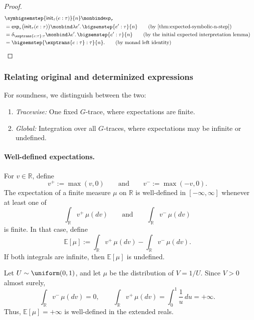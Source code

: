 \begin{proof}
  \begin{align}
    &\symbigsemstep{\mathsf{init}_\tau(e:\tau)}{n}
    \monbind
    \mathsf{exp}_\tau
    \notag
    \\
    &=
    \mathsf{exp}_\tau\bigl(\mathsf{init}_\tau(e:\tau)\bigr)
    \monbind
    \lambda e'.\,\bigsemstep{e':\tau}{n}
    \tag{\text{by \Cref{thm:expected-symbolic-n-step}}}
    \\
    &=
    \delta_{\exptrans{e:\tau}:\tau}
    \monbind
    \lambda e'.\,\bigsemstep{e':\tau}{n}
    \tag{\text{by the initial expected interpretation lemma}}
    \\
    &=
    \bigsemstep{\exptrans{e:\tau}:\tau}{n}.
    \tag{\text{by monad left identity}}
  \end{align}
\end{proof}



\subsubsection{Relating original and determinized expressions}

For soundness, we distinguish between the two:
\begin{enumerate}
  \item \emph{Tracewise:} One fixed $G$-trace, where expectations are finite. 
  \item \emph{Global:} Integration over all $G$-traces, where expectations may be infinite or undefined. 
\end{enumerate}

\paragraph{Well-defined expectations.}
For $v\in\mathbb R$, define
\[
  v^+ := \max(v,0)
  \qquad\text{and}\qquad
  v^- := \max(-v,0).
\]
The expectation of a finite measure $\mu$ on $\mathbb R$ is
well-defined in $[-\infty,\infty]$ whenever at least one of
\[
  \int_{\mathbb R} v^+\,\mu(dv)
  \qquad\text{and}\qquad
  \int_{\mathbb R} v^-\,\mu(dv)
\]
is finite. In that case, define
\[
  \mathbb E[\mu]
  :=
  \int_{\mathbb R} v^+\,\mu(dv)
  -
  \int_{\mathbb R} v^-\,\mu(dv).
\]
If both integrals are infinite, then $\mathbb E[\mu]$ is undefined.

\begin{example}
  Let $U\sim\uniform(0,1)$, and let $\mu$ be the distribution of
  $V=1/U$. Since $V>0$ almost surely,
  \[
    \int_{\mathbb R}v^-\,\mu(dv)=0,
    \qquad
    \int_{\mathbb R}v^+\,\mu(dv)
    =
    \int_0^1\frac{1}{u}\,du
    =
    +\infty.
  \]
  Thus, $\mathbb E[\mu]=+\infty$ is well-defined in the extended reals.
\end{example}

